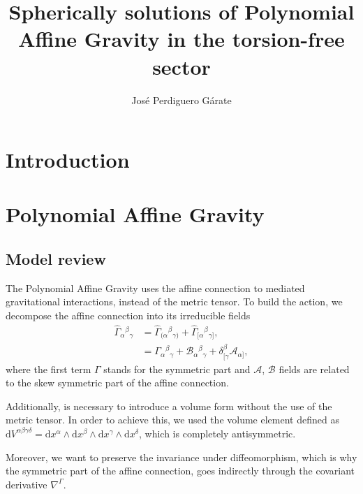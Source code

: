 \documentclass{article}
\title{Spherically solutions of Polynomial Affine Gravity in the torsion-free sector}
\author{Jos\'e Perdiguero G\'arate}
\providecommand{\ctG}[3]{\Gamma_{#1}{}^{ #2}{}_{#3}}
\providecommand{\B}[3]{\mathcal{B}_{#1}{}^{ #2}{}_{#3}}
\providecommand{\A}[1]{\mathcal{A}_{#1}}
\begin{document}
\maketitle

\section{Introduction}
\label{sec:Introduction}



\section{Polynomial Affine Gravity}
\label{sec:PAG}


\subsection{Model review}
\label{subsec: model_review}

The Polynomial Affine Gravity uses the affine connection to mediated 
gravitational interactions, instead of the metric tensor. To build 
the action, we decompose the affine connection into its irreducible
fields
\begin{equation}
\begin{aligned}
    \label{affine_connection}
    \hat{\Gamma}_{\alpha}{}^{\beta}{}_{\gamma} & = \hat{\Gamma}_{(\alpha}{}^{\beta}{}_{\gamma)} +  \hat{\Gamma}_{[\alpha}{}^{\beta}{}_{\gamma]},  \\
    & = \ctG{\alpha}{\beta}{\gamma} + \B{\alpha}{\beta}{\gamma} + \delta^{\beta}_{[\gamma}\A{\alpha]},
\end{aligned}
\end{equation}
where the first term $\Gamma$ stands for the symmetric part and 
$\mathcal{A}$, $\mathcal{B}$ fields are related to the skew symmetric
part of the affine connection. 

Additionally, is necessary to introduce a volume form without
the use of the metric tensor. In order to achieve this, we used
the volume element defined as $\mathrm{d}V^{\alpha \beta \gamma \delta} 
= \mathrm{d}x^\alpha \wedge \mathrm{d}x^\beta \wedge \mathrm{d}x^\gamma
\wedge \mathrm{d}x^\delta$, which is completely antisymmetric.

Moreover, we want to preserve the invariance under diffeomorphism, 
which is why the symmetric part of the affine connection, goes 
indirectly through the covariant derivative $\nabla^\Gamma$. 
\end{document}
